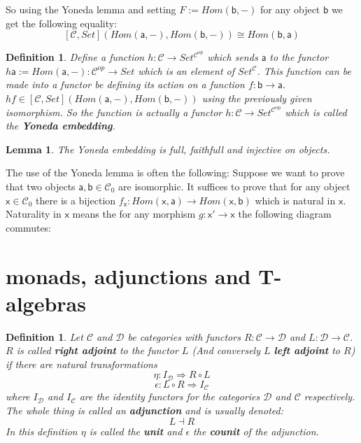 \documentclass{article}
\newcommand{\cat}[1]{\mathcal{#1}} %
\newcommand{\cato}[1]{\cat{#1}_0} %
\newcommand{\ob}[1]{\mathsf{#1}} %
\newcommand{\catop}[1]{\cat{#1}^{op}}
\newtheorem{lemma}[theorem]{Lemma}
\newtheorem{definition}[theorem]{Definition}
\begin{document}
So using the Yoneda lemma and setting $F := Hom(\ob{b}, -)$ for any object $\ob{b}$ we get the following equality:
$$[\cat{C}, Set](Hom(\ob{a}, -), Hom(\ob{b}, -)) \cong Hom(\ob{b}, \ob{a})$$

\begin{definition}
	Define a function $h: \cat{C} \rightarrow Set^{\catop{C}}$ which sends $\ob{a}$ to the functor $h\ob{a} := Hom(\ob{a}, -): \catop{C} \rightarrow Set$ which is an element of $Set^\cat{C}$.
	This function can be made into a functor be defining its action on a function $f: \ob{b} \rightarrow \ob{a}$. $hf \in [\cat{C}, Set](Hom(\ob{a}, -), Hom(\ob{b}, -))$ using the previously given isomorphism.
	So the function is actually a functor $h: \cat{C} \rightarrow Set^{\catop{C}}$ which is called the \textbf{Yoneda embedding}.
\end{definition}

\begin{lemma}
	The Yoneda embedding is full, faithfull and injective on objects.
\end{lemma}

The use of the Yoneda lemma is often the following:
Suppose we want to prove that two objects $\ob{a}, \ob{b} \in \cato{C}$ are isomorphic.
It suffices to prove that for any object $\ob{x} \in \cato{C}$ there is a bijection $f_\ob{x}: Hom(\ob{x}, \ob{a}) \rightarrow Hom(\ob{x}, \ob{b})$ which is natural in $\ob{x}$.
Naturality in $\ob{x}$ means the for any morphism $g: \ob{x}' \rightarrow \ob{x}$ the following diagram commutes:



\section{monads, adjunctions and T-algebras}

\begin{definition}
	Let $\cat{C}$ and $\cat{D}$ be categories with functors $R: \cat{C} \rightarrow \cat{D}$ and $L: \cat{D} \rightarrow \cat{C}$.
	$R$ is called \textbf{right adjoint} to the functor $L$ (And conversely $L$ \textbf{left adjoint} to $R$) if there are natural transformations
	$$\eta: I_\cat{D} \Rightarrow R \circ L$$
	$$\epsilon: L \circ R \Rightarrow I_\cat{C}$$
	where $I_\cat{D}$ and $I_\cat{C}$ are the identity functors for the categories $\cat{D}$ and $\cat{C}$ respectively.
	The whole thing is called an \textbf{adjunction} and is usually denoted:
	$$L \dashv R$$
	In this definition $\eta$ is called the \textbf{unit} and $\epsilon$ the \textbf{counit} of the adjunction.
\end{definition}
\end{document}
